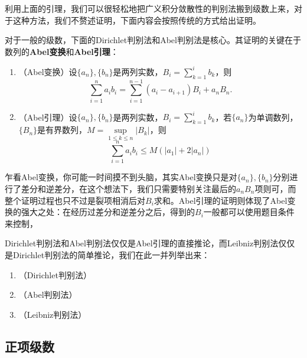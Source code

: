     利用上面的引理，我们可以很轻松地把广义积分敛散性的判别法搬到级数上来，对于这种方法，我们不赘述证明，下面内容会按照传统的方式给出证明。

    对于一般的级数，下面的Dirichlet判别法和Abel判别法是核心。其证明的关键在于数列的\textbf{Abel变换}和\textbf{Abel引理}：
    \begin{lemma}
        \begin{enumerate}
            \item （Abel变换）设\(\{a_n\},\{b_n\}\)是两列实数，\(B_i=\sum\limits_{k=1}^{i}b_k\)，则\[\sum_{i=1}^{n}a_ib_i=\sum_{i=1}^{n-1}(a_i-a_{i+1})B_i+a_nB_n.\]
            \item （Abel引理）设\(\{a_n\},\{b_n\}\)是两列实数，\(B_i=\sum\limits_{k=1}^{i}b_k\)，若\(\{a_n\}\)为单调数列，\(\{B_n\}\)是有界数列，\(M=\sup\limits_{1\leq k\leq n}\vert B_k\vert\)，则\[\sum_{i=1}^{n}a_ib_i\leq M(\vert a_1\vert+2\vert a_n\vert)\]
        \end{enumerate}
    \end{lemma}

    乍看Abel变换，你可能一时间摸不到头脑，其实Abel变换只是对\(\{a_n\},\{b_n\}\)分别进行了差分和逆差分，在这个想法下，我们只需要特别关注最后的\(a_nB_n\)项则可，而整个证明过程也只不过是裂项相消后对\(B_i\)求和。Abel引理的证明则体现了Abel变换的强大之处：在经历过差分和逆差分之后，得到的\(B_i\)一般都可以使用题目条件来控制，

    Dirichlet判别法和Abel判别法仅仅是Abel引理的直接推论，而Leibniz判别法仅仅是Dirichlet判别法的简单推论，我们在此一并列举出来：

    \begin{theorem}
        \begin{enumerate}
            \item （Dirichlet判别法）
            \item （Abel判别法）
            \item （Leibniz判别法）
        \end{enumerate}
    \end{theorem}
    \subsection{正项级数}
    \begin{theorem}[基本判别法]
        
    \end{theorem}
    \begin{theorem}[比较判别法]
        
    \end{theorem}
    \begin{theorem}[积分判别法]
        
    \end{theorem}
    \begin{theorem}[Kummer判别法]
        
    \end{theorem}


